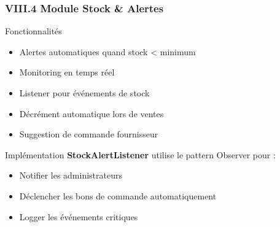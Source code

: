\documentclass[11pt, aspectratio=169]{beamer}
\begin{document}
\begin{frame}
    \frametitle{VIII.4 Module Stock \& Alertes}
    
    \begin{block}{Fonctionnalités}
        \begin{itemize}
            \item[\faBell] Alertes automatiques quand stock \textless{} minimum
            \item[\faEye] Monitoring en temps réel
            \item[\faWarning] Listener pour événements de stock
            \item[\faShoppingCart] Décrément automatique lors de ventes
            \item[\faTruck] Suggestion de commande fournisseur
        \end{itemize}
    \end{block}
    
    \vspace{0.8cm}
    
    \begin{block}{Implémentation}
        \textbf{StockAlertListener} utilise le pattern Observer pour :
        \begin{itemize}
            \item Notifier les administrateurs
            \item Déclencher les bons de commande automatiquement
            \item Logger les événements critiques
        \end{itemize}
    \end{block}
\end{frame}
\end{document}
